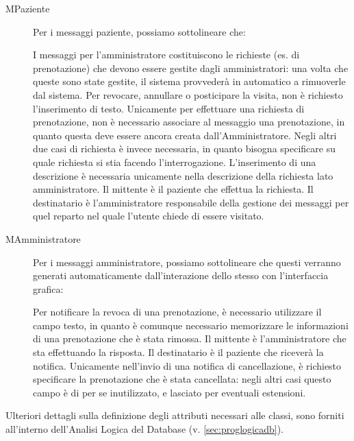\begin{description}
\item[MPaziente]
Per i messaggi paziente, possiamo sottolineare che:
\begin{itemize}
\diam I messaggi per l'amministratore costituiscono le richieste (es. di prenotazione) che
	devono essere gestite dagli amministratori: una volta che queste
	sono state gestite, il sistema provvederà in automatico a rimuoverle
	dal sistema.
\diam Per revocare, annullare o posticipare la visita, non è richiesto
	l'inserimento di testo.
\diam Unicamente per effettuare una richiesta di prenotazione, non è necessario
	associare al messaggio una prenotazione, in quanto questa deve essere
	ancora creata dall'Amministratore. Negli altri due casi di richiesta
	è invece necessaria, in quanto bisogna specificare su quale richiesta
	si stia facendo l'interrogazione.
\diam L'inserimento di una descrizione è necessaria unicamente nella descrizione
	della richiesta lato amministratore.
\diam Il mittente è il paziente che effettua la richiesta.
\diam Il destinatario è l'amministratore responsabile della gestione dei
	messaggi per quel reparto nel quale l'utente chiede di essere visitato.
\end{itemize}

\item[MAmministratore]
Per i messaggi amministratore, possiamo sottolineare che questi verranno
generati automaticamente dall'interazione dello stesso con l'interfaccia grafica:
\begin{itemize}
\diam Per notificare la revoca di una prenotazione, è necessario utilizzare
	il campo testo, in quanto è comunque necessario memorizzare le 
	informazioni di una prenotazione che è stata rimossa.
\diam Il mittente è l'amministratore che sta effettuando la risposta.
\diam Il destinatario è il paziente che riceverà la notifica.
\diam Unicamente nell'invio di una notifica di cancellazione, è richiesto
	specificare la prenotazione che è stata cancellata: negli altri casi
	questo campo è di per se inutilizzato, e lasciato per eventuali estensioni.
\end{itemize}
\end{description}

Ulteriori dettagli sulla definizione degli attributi necessari alle classi,
sono forniti all'interno dell'Analisi Logica del Database (v. \vref{sec:proglogicadb}).

